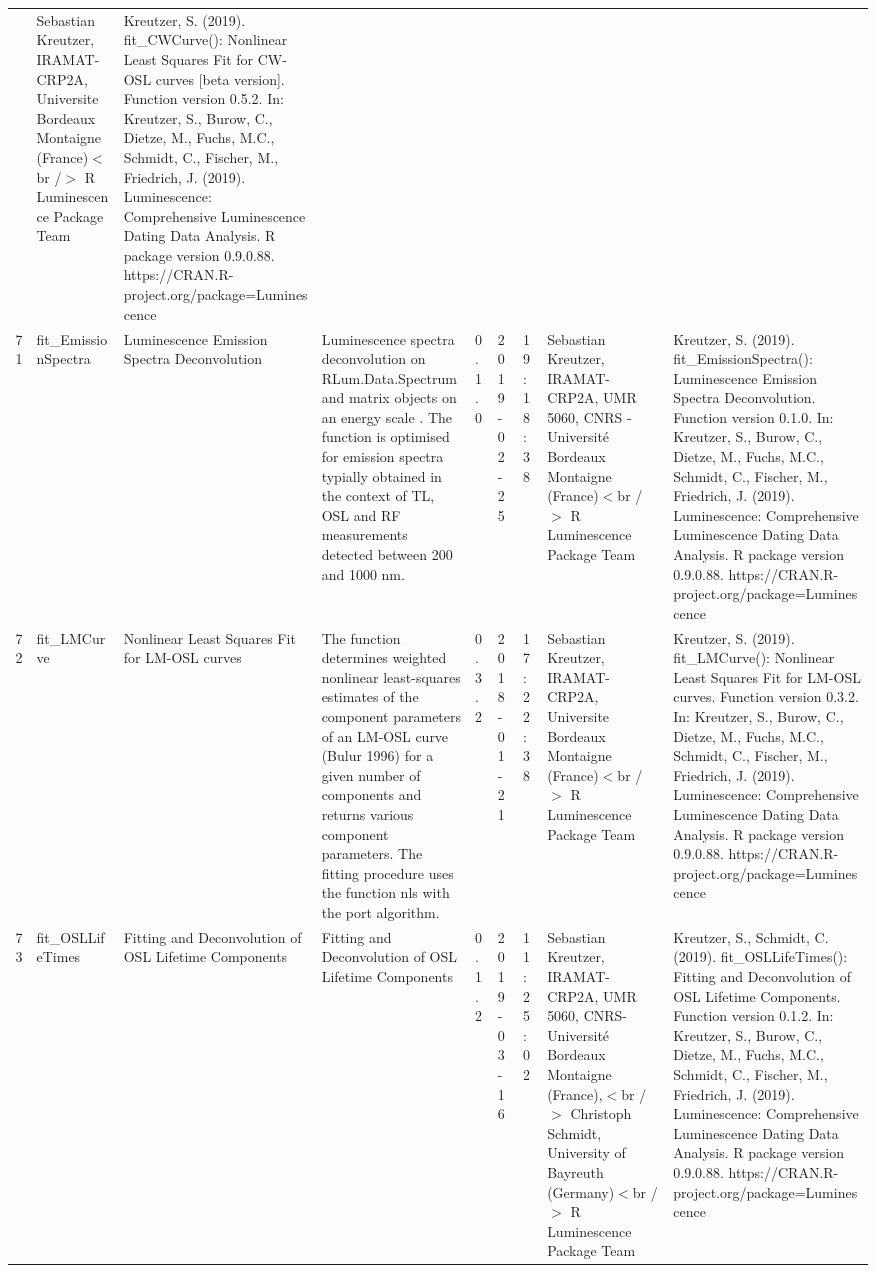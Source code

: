 \begin{table}[ht]
\begin{tabular}{rllllllll}
 & Sebastian Kreutzer, IRAMAT-CRP2A, Universite Bordeaux Montaigne (France)$<$br /$>$  R Luminescence Package Team & Kreutzer, S. (2019). fit\_CWCurve(): Nonlinear Least Squares Fit for CW-OSL curves [beta version]. Function version 0.5.2. In: Kreutzer, S., Burow, C., Dietze, M., Fuchs, M.C., Schmidt, C., Fischer, M., Friedrich, J. (2019). Luminescence: Comprehensive Luminescence Dating Data Analysis. R package version 0.9.0.88. https://CRAN.R-project.org/package=Luminescence
 \\ 
  71 & fit\_EmissionSpectra & Luminescence Emission Spectra Deconvolution & Luminescence spectra deconvolution on  RLum.Data.Spectrum  and  matrix  objects on an  energy scale . The function is optimised for emission spectra typially obtained in the context of TL, OSL and RF measurements detected between 200 and 1000 nm. & 0.1.0 & 2019-02-25 & 19:18:38
 & Sebastian Kreutzer, IRAMAT-CRP2A, UMR 5060, CNRS - Université Bordeaux Montaigne (France)$<$br /$>$  R Luminescence Package Team & Kreutzer, S. (2019). fit\_EmissionSpectra(): Luminescence Emission Spectra Deconvolution. Function version 0.1.0. In: Kreutzer, S., Burow, C., Dietze, M., Fuchs, M.C., Schmidt, C., Fischer, M., Friedrich, J. (2019). Luminescence: Comprehensive Luminescence Dating Data Analysis. R package version 0.9.0.88. https://CRAN.R-project.org/package=Luminescence
 \\ 
  72 & fit\_LMCurve & Nonlinear Least Squares Fit for LM-OSL curves & The function determines weighted nonlinear least-squares estimates of the component parameters of an LM-OSL curve (Bulur 1996) for a given number of components and returns various component parameters. The fitting procedure uses the function  nls  with the  port  algorithm. & 0.3.2 & 2018-01-21 & 17:22:38
 & Sebastian Kreutzer, IRAMAT-CRP2A, Universite Bordeaux Montaigne (France)$<$br /$>$  R Luminescence Package Team & Kreutzer, S. (2019). fit\_LMCurve(): Nonlinear Least Squares Fit for LM-OSL curves. Function version 0.3.2. In: Kreutzer, S., Burow, C., Dietze, M., Fuchs, M.C., Schmidt, C., Fischer, M., Friedrich, J. (2019). Luminescence: Comprehensive Luminescence Dating Data Analysis. R package version 0.9.0.88. https://CRAN.R-project.org/package=Luminescence
 \\ 
  73 & fit\_OSLLifeTimes & Fitting and Deconvolution of OSL Lifetime Components & Fitting and Deconvolution of OSL Lifetime Components & 0.1.2 & 2019-03-16 & 11:25:02
 & Sebastian Kreutzer, IRAMAT-CRP2A, UMR 5060, CNRS-Université Bordeaux Montaigne (France),$<$br /$>$ Christoph Schmidt, University of Bayreuth (Germany)$<$br /$>$  R Luminescence Package Team & Kreutzer, S., Schmidt, C. (2019). fit\_OSLLifeTimes(): Fitting and Deconvolution of OSL Lifetime Components. Function version 0.1.2. In: Kreutzer, S., Burow, C., Dietze, M., Fuchs, M.C., Schmidt, C., Fischer, M., Friedrich, J. (2019). Luminescence: Comprehensive Luminescence Dating Data Analysis. R package version 0.9.0.88. https://CRAN.R-project.org/package=Luminescence

\end{tabular}
\end{table}
